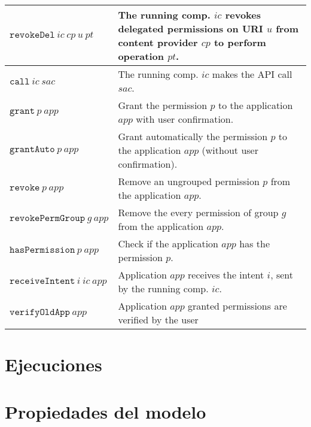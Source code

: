 \begin{table}
\begin{tabularx}{\linewidth}{|l X|}
	\hline
	$\mathtt{revokeDel}~ic~cp~u~pt$	& The running comp. $ic$ revokes delegated permissions on URI $u$ from content provider $cp$ to perform operation $pt$. \\
	\hline
	$\mathtt{call}~ic~sac$	& The running comp. $ic$ makes the API call $sac$. \\
	\hline
	$\mathtt{grant}~p~app$	& Grant the permission $p$ to the application $app$ with user confirmation. \\ 
	\hline
	$\mathtt{grantAuto}~p~app$	& Grant automatically the permission $p$ to the application $app$ (without user confirmation). \\
	\hline
	$\mathtt{revoke}~p~app$	& Remove an ungrouped permission $p$ from the application $app$. \\
	\hline
	$\mathtt{revokePermGroup}~g~app$	& Remove the every permission of group $g$ from the application $app$. \\
	\hline
	$\mathtt{hasPermission}~p~app$	& Check if the application $app$ has the permission $p$. \\
	\hline
	$\mathtt{receiveIntent}~i~ic~app$	& Application $app$ receives the intent $i$, sent by the running comp. $ic$. \\
	\hline
	$\mathtt{verifyOldApp}~app$	& Application $app$ granted permissions are verified by the user  \\
	\hline
  \end{tabularx}
\end{table}

\section{Ejecuciones}

\section{Propiedades del modelo}